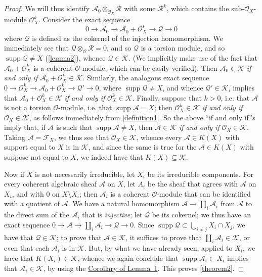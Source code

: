 \documentclass{article}
\theoremstyle{plain}
\theoremstyle{definition}
\newcommand{\sh}{\mathscr}
\newcommand{\cat}{\mathcal}
\newcommand{\supp}{\operatorname{supp}}
\newcommand{\oldpage}[1]{\marginpar{\footnotesize$\Big\vert$ \textit{p.~#1}}}
\begin{document}
\begin{proof}
  We will thus identify $\sh{A}_0\otimes_{\sh{O}_X}\sh{R}$ with some $\sh{R}^k$, which contains the sub-$\sh{O}_X$-module $\sh{O}_X^k$.
  Consider the exact sequence
  \[
    0 \to \sh{A}_0 \to \sh{A}_0+\sh{O}_X^k \to \sh{Q} \to 0
  \]
  where $\sh{Q}$ is defined as the cokernel of the injection homomorphism.
  We immediately see that $\sh{Q}\otimes_{\sh{O}}\sh{R}=0$, and so $\sh{Q}$ is a torsion module, and so $\supp\sh{Q}\neq X$ (\cref{lemma2}), whence $\sh{Q}\in\cat{K}$.
  (We implicitly make use of the fact that $\sh{A}_0+\sh{O}_X^k$ is a coherent $\sh{O}$-module, which can be easily verified).
  Then $\sh{A}_0\in\cat{K}$ \emph{if and only if} $\sh{A}_0+\sh{O}_X^k\in\cat{K}$.
  Similarly, the analogous exact sequence
  \oldpage{2-04}
  $0\to\sh{O}_X^k\to\sh{A}_0+\sh{O}_X^k\to\sh{Q}'\to0$, where $\supp\sh{Q}\neq X$, and whence $\sh{Q}'\in\cat{K}$, implies that $\sh{A}_0+\sh{O}_X^k\in\cat{K}$ \emph{if and only if} $\sh{O}_X^k\in\cat{K}$.
  Finally, suppose that $k>0$, i.e. that $\sh{A}$ is not a torsion $\sh{O}$-module, i.e. that $\supp\sh{A}=X$;
  then $\sh{O}_X^k\in\cat{K}$ \emph{if and only if} $\sh{O}_X\in\cat{K}$, as follows immediately from \cref{definition1}.
  So the above ``if and only if''s imply that, if $\sh{A}$ is such that $\supp\sh{A}\neq X$, then $\sh{A}\in\cat{K}$ \emph{if and only if} $\sh{O}_X\in\cat{K}$.
  Taking $\sh{A}=\sh{F}_X$, we thus see that $\sh{O}_X\in\cat{K}$, whence every $\sh{A}\in K(X)$ with support equal to $X$ is in $\cat{K}$, and since the same is true for the $\sh{A}\in K(X)$ with suppose not equal to $X$, we indeed have that $K(X)\subseteq\cat{K}$.

  Now if $X$ is not necessarily irreducible, let $X_i$ be its irreducible components.
  For every coherent algebraic sheaf $\sh{A}$ on $X$, let $A_i$ be the sheaf that agrees with $\sh{A}$ on $X_i$, and with $0$ on $X\setminus X_i$;
  then $\sh{A}_i$ is a coherent $\sh{O}$-module that can be identified with a quotient of $\sh{A}$.
  We have a natural homomorphism $\sh{A}\to\coprod_i\sh{A}_i$ from $\sh{A}$ to the direct sum of the $\sh{A}_i$ that is \emph{injective};
  let $\sh{Q}$ be its cokernel;
  we thus have an exact sequence $0\to\sh{A}\to\coprod_i\sh{A}_i\to\sh{Q}\to0$.
  Since $\supp\sh{Q}\subset\bigcup_{i\neq j}X_i\cap X_j$, we have that $\sh{Q}\in\cat{K}$;
  to prove that $\sh{A}\in\cat{K}$, it suffices to prove that $\coprod_i\sh{A}_i\in\cat{K}$, or even that each $\sh{A}_i$ is in $\cat{K}$.
  But, by what we have already seen, applied to $X_i$, we have that $K(X_i)\in\cat{K}$, whence we again conclude that $\supp\sh{A}_i\subset X_i$ implies that $\sh{A}_i\in\cat{K}$, by using the \hyperref[corollary-1]{Corollary of Lemma~1}.
  This proves \cref{theorem2}.
\end{proof}
\end{document}
